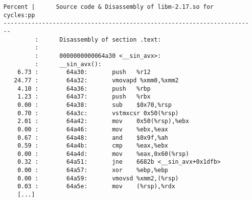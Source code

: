 \documentclass[a4paper]{jpconf}
\begin{document}
\begin{appendices}
\begin{minipage}{\linewidth}
\begin{lstlisting}[language={[x64]Assembler},basicstyle=\ttfamily\tiny,
caption=\_\_sin\_avx cycles annotation]
Percent |      Source code & Disassembly of libm-2.17.so for  cycles:pp
------------------------------------------------------------------------
         :      Disassembly of section .text:
         :
         :      0000000000064a30 <__sin_avx>:
         :      __sin_avx():
    6.73 :        64a30:       push   %r12
   24.77 :        64a32:       vmovapd %xmm0,%xmm2
    4.10 :        64a36:       push   %rbp
    1.23 :        64a37:       push   %rbx
    0.00 :        64a38:       sub    $0x70,%rsp
    0.70 :        64a3c:       vstmxcsr 0x50(%rsp)
    2.01 :        64a42:       mov    0x50(%rsp),%ebx
    0.00 :        64a46:       mov    %ebx,%eax
    0.67 :        64a48:       and    $0x9f,%ah
    0.59 :        64a4b:       cmp    %eax,%ebx
    0.00 :        64a4d:       mov    %eax,0x60(%rsp)
    0.32 :        64a51:       jne    6682b <__sin_avx+0x1dfb>
    0.00 :        64a57:       xor    %ebp,%ebp
    0.00 :        64a59:       vmovsd %xmm2,(%rsp)
    0.03 :        64a5e:       mov    (%rsp),%rdx
    [...]
\end{lstlisting}
\end{minipage}


\end{appendices}
\end{document}
